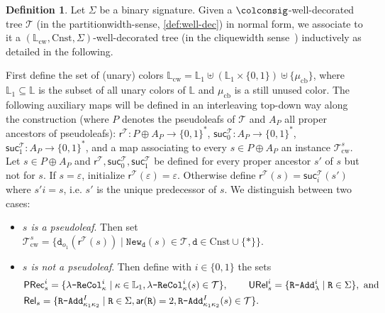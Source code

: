 \documentclass[10pt,a4paper]{amsart}
\theoremstyle{definition}
\numberwithin{equation}{section}
\theoremstyle{plain}
\theoremstyle{definition}
\newtheorem{definition}[definition]{Definition}
\theoremstyle{myexample}
\theoremstyle{plain}
\theoremstyle{definition}
\newcommand{\origcol}{o}
\newcommand{\cols}{\mathbb{L}}
\newcommand{\arity}[1]{\fcn{ar}(#1)}
\newcommand{\disun}{\oplus}
\newcommand{\newconst}[1]{\pred{New}_{\const{#1}}} %
\newcommand{\radd}[4]{#4\pred{\texttt{-}Add}^{#3}_{#1#2}}
\newcommand{\unradd}[2]{#2\pred{\texttt{-}Add}_{#1}}
\newcommand{\recol}[2]{#2\pred{\texttt{-}ReCol}_{#1}}
\newcommand{\partitionwidth}{par\-ti\-tion\-width}
\newcommand{\fcn}[1]{\mathsf{#1}}
\newcommand{\pred}[1]{\mathtt{#1}}
\newcommand{\const}[1]{\mathtt{#1}}
\newcommand{\rpred}{\pred{R}}
\begin{document}
\begin{definition}\label{def:hcwtocw-bin}
	Let $\Sigma$ be a binary signature. Given a $\colconsig$-well-decorated tree $\mathcal{T}$ (in the \partitionwidth{}-sense, \cref{def:well-dec}) in normal form, we associate to it a $(\cols_{\mathrm{cw}}, \mathrm{Cnst}, \Sigma)$-well-decorated tree (in the cliquewidth sense~\cite[Definition 6]{ICDT2023}) inductively as detailed in the following.
	
	First define the set of (unary) colors $\cols_{\mathrm{cw}} = \cols_1 \uplus (\cols_1 \times \{ 0,1 \}) \uplus \{ \mu_{\mathrm{cb}}\}$, where $\cols_1\subseteq\cols$ is the subset of all unary colors of $\cols$ and $\mu_{\mathrm{cb}}$ is a still unused color.
	The following auxiliary maps will be defined in an interleaving top-down way along the construction (where $P$ denotes the pseudoleafs of $\mathcal{T}$ and $A_P$ all proper ancestors of pseudoleafs):  $\fcn{r}^{\mathcal{T}}\colon P\disun A_{P} \to \{ 0,1 \}^*$, $\fcn{suc}^{\mathcal{T}}_0\colon A_{P} \to \{ 0,1 \}^*$, $\fcn{suc}^{\mathcal{T}}_1\colon A_{P} \to \{ 0,1 \}^*$, and a map associating to every $s\in P\disun A_P$ an instance $\mathcal{T}_{\mathrm{cw}}^{s}$.
	Let $s\in P\disun A_{P}$ and $\fcn{r}^{\mathcal{T}}, \fcn{suc}^{\mathcal{T}}_0, \fcn{suc}^{\mathcal{T}}_1$ be defined for every proper ancestor $s'$ of $s$ but not for $s$. 
	If $s = \varepsilon$, initialize $\fcn{r}^{\mathcal{T}}\!(\varepsilon) = \varepsilon$. Otherwise define $\fcn{r}^{\mathcal{T}}\!(s) = \fcn{suc}_{i}^{\mathcal{T}}(s')$ where $s'i = s$, i.e. $s'$ is the unique predecessor of $s$.
	We distinguish between two cases:
	\begin{itemize}
		\item \emph{$s$ is a pseudoleaf}. Then set $\mathcal{T}_{\mathrm{cw}}^{s} = \{ \const{d}_{\origcol_1}(\fcn{r}^{\mathcal{T}}\!(s)) \mid \newconst{d}(s)\in\mathcal{T}, \const{d} \in \mathrm{Cnst} \cup \{\ast\} \}$.
		\item \emph{$s$ is not a pseudoleaf}. Then define with $i\in\{ 0,1 \}$ the sets
		\begin{align*}
			&\fcn{PRec}^{i}_{s} = \{ \recol{\kappa}{\lambda}^{i} \mid \kappa\in\cols_1,  \recol{\kappa}{\lambda}^{i}(s)\in\mathcal{T} \},  \hspace{5ex}\fcn{URel}^{i}_{s} = \{ \unradd{\lambda}{\rpred}^{i} \mid \rpred\in\Sigma \}, \text{ and} \\
			&\fcn{Rel}_{s} = \{ \radd{\kappa_1}{\kappa_2}{I}{\rpred} \mid \rpred\in\Sigma, \arity{\rpred} = 2,  \radd{\kappa_1}{\kappa_2}{I}{\rpred}(s)\in\mathcal{T}  \}.

\end{align*}
\end{itemize}
\end{definition}
\end{document}
